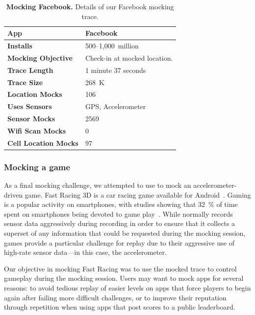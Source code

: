 \begin{table}[t]
\begin{tabularx}{3.33in}{lX}
\textbf{App} & Facebook \\ \toprule
\textbf{Installs} & 500--1,000~million \\
\textbf{Mocking Objective} & Check-in at mocked location. \\
  \midrule
\textbf{Trace Length} & 1 minute 37 seconds \\
\textbf{Trace Size} & 268~K \\
\textbf{Location Mocks} & 106 \\
\textbf{Uses Sensors} & GPS, Accelerometer \\
\textbf{Sensor Mocks} & 2569 \\
\textbf{Wifi Scan Mocks} & 0 \\
\textbf{Cell Location Mocks} & 97 \\
\end{tabularx}

\caption{\textbf{Mocking Facebook.} Details of our Facebook mocking trace.}

\label{table-mocking-facebook}

\end{table}

\subsubsection{Mocking a game}

As a final mocking challenge, we attempted to use \PocketMocker{} to mock an
accelerometer-driven game. Fast Racing 3D is a car racing game available for
Android~\cite{fastracing-playstore-url}. Gaming is a popular activity on
smartphones, with studies showing that 32~\% of time spent on smartphones
being devoted to game play~\cite{flurry-smartphoneuse}. While \PocketMocker{}
normally records sensor data aggressively during recording in order to ensure
that it collects a superset of any information that could be requested during
the mocking session, games provide a particular challenge for replay due to
their aggressive use of high-rate sensor data---in this case, the
accelerometer.

Our objective in mocking Fast Racing was to use the mocked trace to control
gameplay during the mocking session. Users may want to mock apps for several
reasons: to avoid tedious replay of easier levels on apps that force players
to begin again after failing more difficult challenges, or to improve their
reputation through repetition when using apps that post scores to a public
leaderboard.

